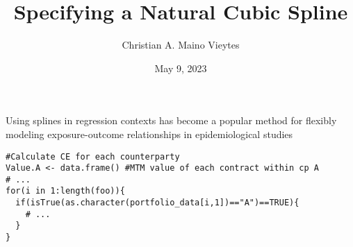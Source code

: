 \documentclass{article}
\title{Specifying a Natural Cubic Spline}
\author{Christian A. Maino Vieytes}
\date{May 9, 2023}
\begin{document}
\maketitle
{}
Using splines in regression contexts has become a popular method for flexibly modeling exposure-outcome relationships in epidemiological studies \supercite{maclure_tests_1992, witte_nested_1997}



\newpage
\begin{lstlisting}
#Calculate CE for each counterparty
Value.A <- data.frame() #MTM value of each contract within cp A
# ...
for(i in 1:length(foo)){
  if(isTrue(as.character(portfolio_data[i,1])=="A")==TRUE){
    # ...
  }
}
\end{lstlisting}


\printbibliography[type=article,title={References}]
\end{document}
